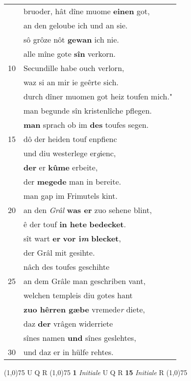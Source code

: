 \documentclass[8pt,a4paper,notitlepage]{article}
\begin{document}
\begin{table}[ht]
\begin{minipage}[t]{0.5\linewidth}
\begin{tabular}{rl}
 & bruoder, hât dîne muome \textbf{einen} got,\\ 
 & an den geloube ich und an sie.\\ 
 & sô grôze nôt \textbf{gewan} ich nie.\\ 
 & alle mîne gote \textbf{sîn} verkorn.\\ 
10 & Secundille habe ouch verlorn,\\ 
 & waz si an mir ie geêrte sich.\\ 
 & durch dîner muomen got heiz toufen mich."\\ 
 & man begunde sîn kristenlîche pflegen.\\ 
 & \textbf{man} sprach ob im \textbf{des} toufes segen.\\ 
15 & dô der heiden touf enpfienc\\ 
 & und diu westerlege er\textit{g}ienc,\\ 
 & \textbf{der} er \textbf{kûme} erbeite,\\ 
 & der \textbf{megede} man in bereite.\\ 
 & man gap im Frimutels kint.\\ 
20 & an den \textit{Grâl} \textbf{was er} zuo sehene blint,\\ 
 & ê der touf \textbf{in hete} \textbf{bedecket}.\\ 
 & sît wart \textbf{er} \textbf{vor i\textit{m}} \textbf{blecket},\\ 
 & der Grâl mit gesihte.\\ 
 & nâch des toufes geschihte\\ 
25 & an dem Grâle man geschriben vant,\\ 
 & welchen templeis diu gotes hant\\ 
 & \textbf{zuo hêrren gæbe} vremede\textit{r} diete,\\ 
 & daz \textbf{der} vrâgen widerriete\\ 
 & sînes namen \textbf{und} sînes geslehtes,\\ 
30 & und daz er in hülfe rehtes.\\ 
\end{tabular}
\scriptsize
\line(1,0){75} \newline
U Q R \newline
\line(1,0){75} \newline
\textbf{1} \textit{Initiale} U Q R  \textbf{15} \textit{Initiale} R  \newline
\line(1,0){75} \newline

\end{minipage}
\end{table}
\end{document}
